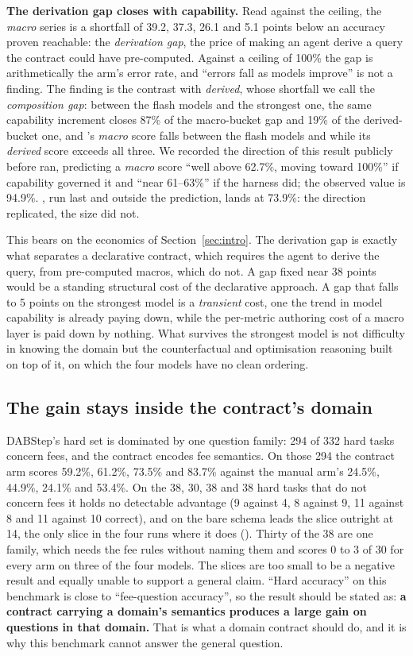 \textbf{The derivation gap closes with capability.} Read against the
ceiling, the \emph{macro} series is a shortfall of 39.2, 37.3, 26.1 and 5.1
points below an accuracy proven reachable: the \emph{derivation gap}, the
price of making an agent derive a query the contract could have
pre-computed. Against a ceiling of 100\% the gap is arithmetically the arm's
error rate, and ``errors fall as models improve'' is not a finding. The
finding is the contrast with \emph{derived}, whose shortfall we call the
\emph{composition gap}: between the flash models and the strongest one, the same capability increment closes 87\% of the
macro-bucket gap and 19\% of the derived-bucket one, and \mSON{}'s
\emph{macro} score falls between the flash models and \mGPT{} while its
\emph{derived} score exceeds all three. We recorded the direction of this
result publicly before \mGPT{} ran, predicting a \emph{macro} score ``well
above 62.7\%, moving toward 100\%'' if capability governed it and ``near
61--63\%'' if the harness did; the observed value is 94.9\%. \mSON{}, run
last and outside the prediction, lands at 73.9\%: the direction replicated,
the size did not.

This bears on the economics of Section~\ref{sec:intro}. The derivation gap
is exactly what separates a declarative contract, which requires the agent
to derive the query, from pre-computed macros, which do not. A gap fixed
near 38 points would be a standing structural cost of the declarative
approach. A gap that falls to 5 points on the strongest model is a
\emph{transient} cost, one the trend in model capability is already paying
down, while the per-metric authoring cost of a macro layer is paid down by
nothing. What survives the strongest model is not difficulty in knowing the
domain but the counterfactual and optimisation reasoning built on top of it,
on which the four models have no clean ordering.

\subsection{The gain stays inside the contract's domain}
\label{sec:domain}

DABStep's hard set is dominated by one question family: 294 of 332 hard
tasks concern fees, and the contract encodes fee semantics. On those 294 the
contract arm scores 59.2\%, 61.2\%, 73.5\% and 83.7\% against the manual
arm's 24.5\%, 44.9\%, 24.1\% and 53.4\%. On the 38, 30, 38 and 38 hard tasks
that do not concern fees it holds no detectable advantage (9 against 4, 8
against 9, 11 against 8 and 11 against 10 correct), and on \mGPT{} the bare
schema leads the slice outright at 14, the only slice in the four runs where
it does (). Thirty of the 38 are one family, which needs
the fee rules without naming them and scores 0 to 3 of 30 for every arm on
three of the four models. The slices are too small to be a negative result
and equally unable to support a general claim. ``Hard accuracy'' on this
benchmark is close to ``fee-question accuracy'', so the result should be
stated as: \textbf{a contract carrying a domain's semantics produces a large
gain on questions in that domain.} That is what a domain contract should do,
and it is why this benchmark cannot answer the general question.
